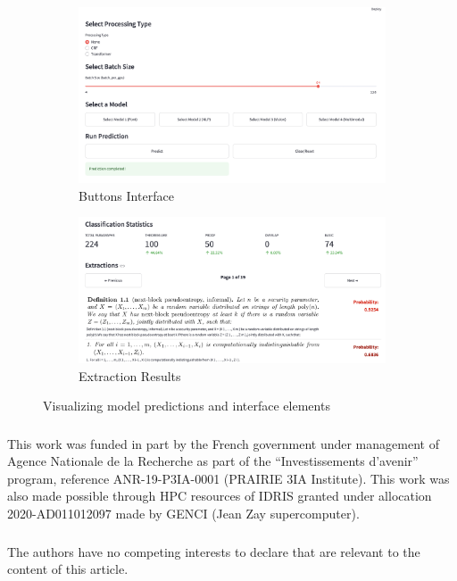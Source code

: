 \documentclass[runningheads]{llncs}
\begin{document}
\begin{figure}
	\begin{subfigure}[b]{0.48\textwidth}
		\centering
		\includegraphics[width=\textwidth]{images/buttons.png}
		\caption{Buttons Interface}
	\end{subfigure}
	\hfill
	\begin{subfigure}[b]{0.48\textwidth}
		\centering
		\includegraphics[width=\textwidth]{images/extractions.png}
		\caption{Extraction Results}
	\end{subfigure}
	\caption{Visualizing model predictions and interface elements}
	\label{fig:predictions_and_interface}
\end{figure}

\begin{credits}
	\subsubsection{\ackname}
	This work was funded in part by the French government under
	management of Agence Nationale de la Recherche as part of the
	“Investissements d’avenir” program, reference ANR-19-P3IA-0001
	(PRAIRIE 3IA Institute). This work was also made possible through
	HPC resources of IDRIS granted under allocation 2020-AD011012097
	made by GENCI (Jean Zay supercomputer).

	\subsubsection{\discintname}
	The authors have no competing interests to declare that are relevant to
	the content of this article.
\end{credits}



\end{document}
